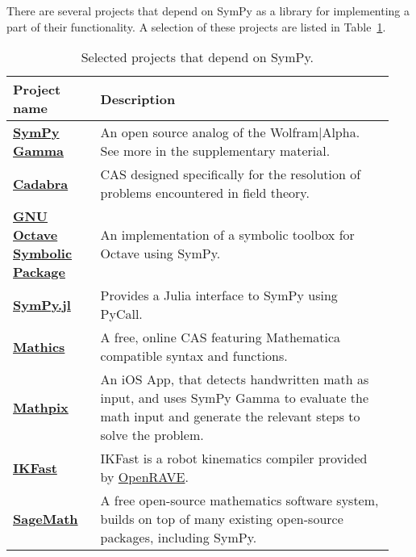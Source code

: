 There are several projects that depend on SymPy as a library for implementing
a part of their functionality. A selection of these projects are listed in
Table~\ref{projects-table}.

\begin{longtable}[htbc]{>{\raggedright}p{0.2\linewidth}p{0.74\linewidth}}
\caption{Selected projects that depend on SymPy.\label{projects-table}}\\
\toprule
\textbf{Project name} & \textbf{Description} \\
\midrule

\href{http://sympygamma.com/}{\textbf{SymPy Gamma}} & An open source
  analog of the Wolfram|Alpha.  See more in the supplementary material. \\

\href{http://cadabra.science/index.html}{\textbf{Cadabra}}~\cite{Peeters2007cadabra} &
  CAS designed specifically for the resolution of problems
  encountered in field theory. \\

\href{https://github.com/cbm755/octsympy}{\textbf{GNU Octave Symbolic Package}}~\cite{OctSymPy} &
  An implementation of a symbolic toolbox for Octave using SymPy. \\

\href{https://github.com/jverzani/SymPy.jl}{\textbf{SymPy.jl}}~\cite{SymPy.jl} &
  Provides a Julia interface to SymPy using PyCall. \\

\href{https://mathics.github.io/}{\textbf{Mathics}}~\cite{Mathics} &
  A free, online CAS featuring Mathematica compatible
  syntax and functions. \\

\href{http://mathpix.com/}{\textbf{Mathpix}}~\cite{Mathpix} & An iOS App, that detects handwritten math as input, and uses
  SymPy Gamma to evaluate the math input and generate the relevant
  steps to solve the problem. \\

\href{http://openrave.org/docs/latest_stable/openravepy/ikfast/}{\textbf{IKFast}}~\cite{diankov2010ikfast} &
  IKFast is a robot kinematics compiler provided by
  \href{http://openrave.org/}{OpenRAVE}. \\

\href{http://www.sagemath.org/}{\textbf{SageMath}}~\cite{sagemath} &
  A free open-source mathematics software system, builds on top of many
  existing open-source packages, including SymPy. \\


\end{longtable}
